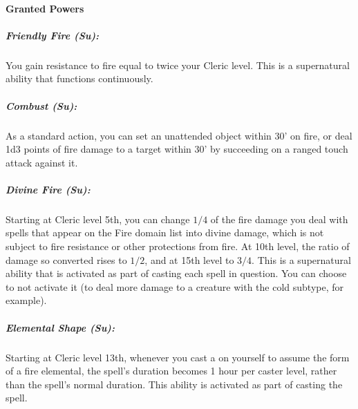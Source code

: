 \paragraph{Granted Powers}
\subparagraph{Friendly Fire (Su):}
You gain resistance to fire equal to twice your Cleric level. This is a supernatural ability that functions continuously.
\subparagraph{Combust (Su):}
As a standard action, you can set an unattended object within 30' on fire, or deal 1d3 points of fire damage to a target within 30' by succeeding on a ranged touch attack against it.
\subparagraph{Divine Fire (Su):} 
Starting at Cleric level 5th, you can change $1/4$ of the fire damage you deal with spells that appear on the Fire domain list into divine damage, which is not subject to fire resistance or other protections from fire.
At 10th level, the ratio of damage so converted rises to $1/2$, and at 15th level to $3/4$.
This is a supernatural ability that is activated as part of casting each spell in question.
You can choose to not activate it (to deal more damage to a creature with the cold subtype, for example).
\subparagraph{Elemental Shape (Su):}
Starting at Cleric level 13th, whenever you cast a  on yourself to assume the form of a fire elemental, 
the spell's duration becomes 1 hour per caster level, rather than the spell's normal duration.
This ability is activated as part of casting the spell.
